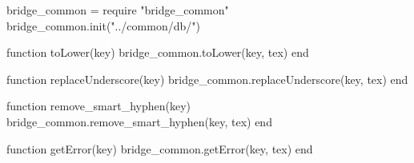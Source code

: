 \begin{luacode}

  bridge_common = require "bridge_common"
  bridge_common.init("../common/db/")

  function toLower(key)
    bridge_common.toLower(key, tex)
  end

  function replaceUnderscore(key)
    bridge_common.replaceUnderscore(key, tex)
  end

  function remove_smart_hyphen(key)
    bridge_common.remove_smart_hyphen(key, tex)
  end

  function getError(key)
    bridge_common.getError(key, tex)
  end

\end{luacode}
